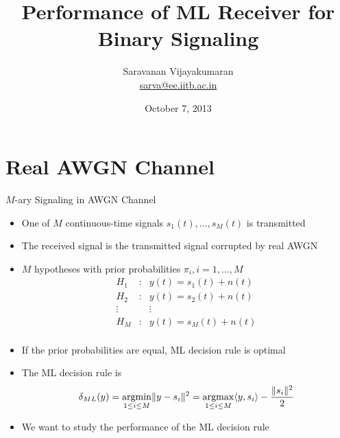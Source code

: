 \documentclass[t]{beamer}
\title[EE 703 DMT]{Performance of ML Receiver for Binary Signaling}
\author[Saravanan V]
{
  Saravanan Vijayakumaran\\
  \href{mailto:sarva@ee.iitb.ac.in}{sarva@ee.iitb.ac.in}
}
\institute[IIT Bombay]
{
  Department of Electrical Engineering\\
  Indian Institute of Technology Bombay
}
\date{October 7, 2013}
\newcommand{\argmax}{\operatornamewithlimits{argmax}}
\newcommand{\argmin}{\operatornamewithlimits{argmin}}
\begin{document}
\begin{frame}
  \titlepage
\end{frame}

\section{Real AWGN Channel}
\begin{frame}{$M$-ary Signaling in AWGN Channel}
  \footnotesize
  \begin{itemize}
    \item \pause One of $M$ continuous-time signals $s_1(t), \ldots, s_M(t)$ is transmitted
    \item \pause The received signal is the transmitted signal corrupted by real AWGN
    \item \pause $M$ hypotheses with prior probabilities $\pi_i, i=1,\ldots,M$
      \begin{equation*}
        \begin{array}{ccc}
            H_1 & : & y(t) = s_1(t) + n(t) \\
            H_2 & : & y(t) = s_2(t) + n(t) \\
            \vdots &   &  \vdots          \\
            H_M & : & y(t) = s_M(t) + n(t) \\
        \end{array}
      \end{equation*}
    \item \pause If the prior probabilities are equal, ML decision rule is optimal
    \item \pause The ML decision rule is
    \begin{eqnarray*}
      \delta_{ML}(y) = \argmin_{1 \leq i \leq M} \lVert y - s_i \rVert^2 = \argmax_{1 \leq i \leq M} \langle y, s_i \rangle - \frac{\lVert s_i \rVert^2}{2}
    \end{eqnarray*}
    \item \pause We want to study the performance of the ML decision rule
  \end{itemize}
  \normalsize
\end{frame}
\end{document}
